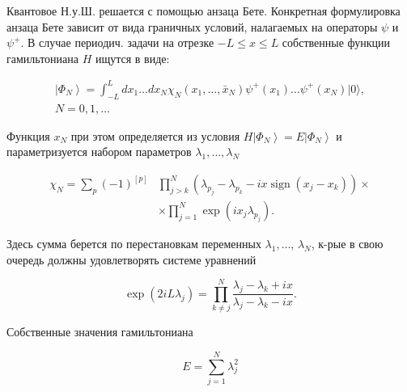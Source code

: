 \documentclass[10pt]{article}
\begin{document}
Квантовое Н.у.Ш. решается с помощью анзаца Бете. Конкретная формулировка анзаца Бете зависит от вида граничных условий, налагаемых на операторы $\psi$ и $\psi^{+}$. В случае периодич. задачи на отрезке $-L \leqslant x \leqslant L$ собственные функции гамильтониана $H$ ищутся в виде:



\[

\begin{gathered}

\left|\Phi_{N}\right\rangle=\int_{-L}^{L} d x_{1} \ldots d x_{N} \chi_{N}\left(x_{1}, \ldots, \bar{x}_{N}\right) \psi^{+}\left(x_{1}\right) \ldots \psi^{+}\left(x_{N}\right)|0\rangle, \\

N=0,1, \ldots

\end{gathered}

\]



Функция $x_{N}$ при этом определяется из условия $H\left|\Phi_{N}\right\rangle=E\left|\Phi_{N}\right\rangle$ и параметризуется набором параметров $\lambda_{1}, \ldots, \lambda_{N}$



\[

\begin{aligned}

\chi_{N}=\sum_{p}(-1)^{[p]} & \prod_{j>k}^{N}\left(\lambda_{p_{j}}-\lambda_{p_{k}}-i x \operatorname{sign}\left(x_{j}-x_{k}\right)\right) \times \\

& \times \prod_{j=1}^{N} \exp \left(i x_{j} \lambda_{p_{j}}\right) .

\end{aligned}

\]



Здесь сумма берется по перестановкам переменных $\lambda_{1}, \ldots$, $\lambda_{N}$, к-рые в свою очередь должны удовлетворять системе уравнений



\[

\exp \left(2 i L \lambda_{j}\right)=\prod_{k \neq j}^{N} \frac{\lambda_{j}-\lambda_{k}+i x}{\lambda_{j}-\lambda_{k}-i x} .

\]



Собственные значения гамильтониана



\[

E=\sum_{j=1}^{N} \lambda_{j}^{2}

\]
\end{document}

